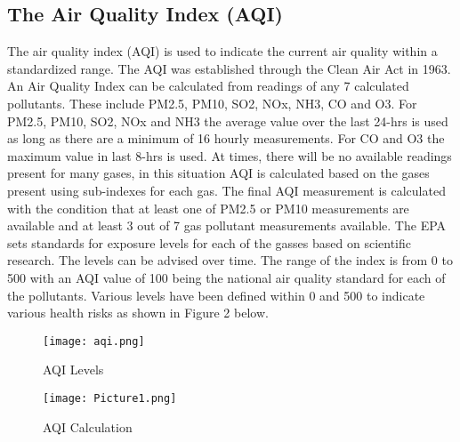 \subsection{The Air Quality Index (AQI)}
The air quality index (AQI) is used to indicate the current air quality within a standardized range. The AQI was established through the Clean Air Act in 1963. An Air Quality Index can be calculated from readings of any 7 calculated pollutants. These include PM2.5, PM10, SO2, NOx, NH3, CO and O3. For PM2.5, PM10, SO2, NOx and NH3 the average value over the last 24-hrs is used as long as there are a minimum of 16 hourly measurements. For CO and O3 the maximum value in last 8-hrs is used. At times, there will be no available readings present for many gases, in this situation AQI is calculated based on the gases present using sub-indexes for each gas. The final AQI measurement is calculated with the condition that at least one of PM2.5 or PM10 measurements are available and at least 3 out of 7 gas pollutant measurements available. The EPA sets standards for exposure levels for each of the gasses based on scientific research. The levels can be advised over time. The range of the index is from 0 to 500 with an AQI value of 100 being the national air quality standard for each of the pollutants. Various levels have been defined within 0 and 500 to indicate various health risks as shown in Figure 2 below. 

\begin{figure}[h]
\centering
\texttt{[image: aqi.png]}
\caption{AQI Levels}
\label{fig:aqiLevels}
\end{figure}

\begin{figure}[h]
\centering
\texttt{[image: Picture1.png]}
\caption{AQI Calculation}
\label{fig:aqiLevels}
\end{figure}
